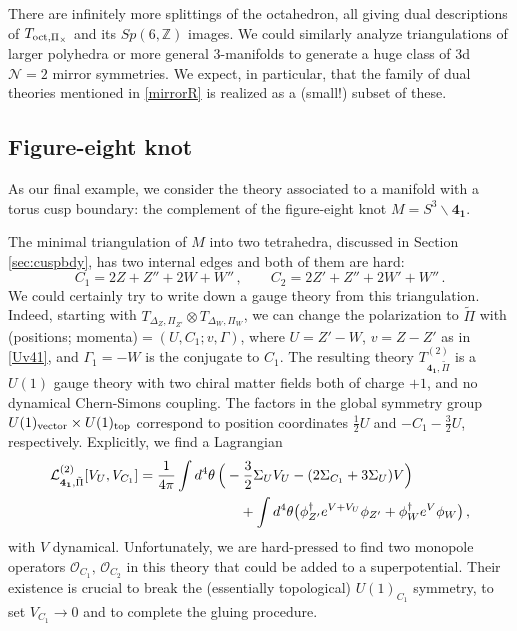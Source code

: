 \documentclass[hyper,letterpaper]{JHEP3}
\numberwithin{equation}{section}
\newcommand{\be}{\begin{equation}}
\newcommand{\ee}{\end{equation}}
\newcommand{\mb}{\mathbf}
\newcommand{\wt}{\widetilde}
\newcommand{\Z}{{\mathbb Z}}
\newcommand{\bs}{\backslash}
\newcommand{\CL}{\mathcal{L}}
\newcommand{\CN}{\mathcal{N}}
\newcommand{\CO}{\mathcal{O}}
\begin{document}
There are infinitely more splittings of the octahedron, all giving dual descriptions of $T_{{\rm oct},\Pi_\times}$ and its $Sp(6,\Z)$ images. We could similarly analyze triangulations of larger polyhedra or more general 3-manifolds to generate a huge class of 3d $\CN=2$ mirror symmetries. We expect, in particular, that the family of dual theories mentioned in \eqref{mirrorR} is realized as a (small!) subset of these.


\subsection{Figure-eight knot}
\label{sec:gauge41}


As our final example, we consider the theory associated to a manifold with a torus cusp boundary: the complement of the figure-eight knot $M=S^3\bs \mb{4_1}$.

The minimal triangulation of $M$ into two tetrahedra, discussed in Section \ref{sec:cuspbdy}, has two internal edges and both of them are hard:
%
\be C_1 = 2Z+Z''+2W+W''\,,\qquad C_2 = 2Z'+Z''+2W'+W'' \,.\ee
%
We could certainly try to write down a gauge theory from this triangulation. Indeed, starting with $T_{\Delta_Z,\Pi_{Z'}}\otimes T_{\Delta_W,\Pi_W}$, we can change the polarization to $\wt\Pi$ with (positions; momenta)$=(U,C_1;v,\Gamma)$, where $U=Z'-W$, $v=Z-Z'$ as in \eqref{Uv41}, and $\Gamma_1=-W$ is the conjugate to $C_1$. The resulting theory $T^{(2)}_{\mb{4_1},\tilde\Pi}$ is a $U(1)$ gauge theory with two chiral matter fields both of charge $+1$, and no dynamical Chern-Simons coupling. The factors in the global symmetry group $U(1)_{\rm vector}\times U(1)_{\rm top}$ correspond to position coordinates $\tfrac12U$ and $-C_1-\tfrac32U$, respectively. Explicitly, we find a Lagrangian
%
\begin{align}
\CL^{(2)}_{\mb{4_1},\tilde\Pi}[V_U,V_{C_1}] &= \frac{1}{4\pi}\int d^4\theta\,\Big(-\frac32 \Sigma_U V_U-(2\Sigma_{C_1}+3\Sigma_U)V\Big) \notag \\
 &\hspace{1in} +\int d^4\theta \big( \phi_{Z'}^\dagger e^{V+V_U}\phi_{Z'}+ \phi_W^\dagger e^{V} \phi_W\big)\,,
\label{41tet2}
\end{align}
%
with $V$ dynamical. Unfortunately, we are hard-pressed to find two monopole operators $\CO_{C_1},\,\CO_{C_2}$ in this theory that could be added to a superpotential. Their existence is crucial to break the (essentially topological) $U(1)_{C_1}$ symmetry, to set $V_{C_1}\to 0$ and to complete the gluing procedure.
\end{document}
